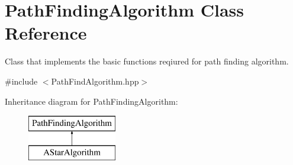 \hypertarget{classPathFindingAlgorithm}{\section{Path\-Finding\-Algorithm Class Reference}
\label{classPathFindingAlgorithm}
}


Class that implements the basic functions reqiured for path finding algorithm.  




{\ttfamily \#include $<$Path\-Find\-Algorithm.\-hpp$>$}

Inheritance diagram for Path\-Finding\-Algorithm\-:\begin{figure}[H]
\begin{center}
\leavevmode
\includegraphics[height=2.000000cm]{d7/df1/classPathFindingAlgorithm}
\end{center}
\end{figure}
